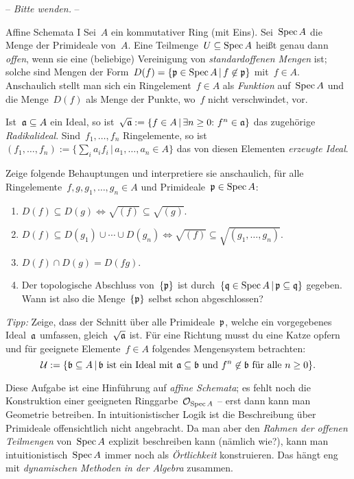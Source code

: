 \documentclass{uebblatt}
\begin{document}
\begin{center}-- \emph{Bitte wenden.} --\end{center}

\newpage

\begin{aufgabe}{Affine Schemata I}
Sei~$A$ ein kommutativer Ring (mit Eins). Sei~$\operatorname{Spec} A$ die Menge der Primideale
von~$A$. Eine Teilmenge~$U \subseteq \operatorname{Spec} A$ heißt genau dann \emph{offen},
wenn sie eine (beliebige) Vereinigung von \emph{standardoffenen Mengen}
ist; solche sind Mengen der Form~$D(f) = \{ \mathfrak{p} \in \operatorname{Spec} A \,|\, f \not\in
\mathfrak{p} \}$ mit~$f \in A$. Anschaulich stellt man sich ein Ringelement~$f \in A$
als \emph{Funktion} auf~$\operatorname{Spec} A$ und die Menge~$D(f)$ als Menge der Punkte,
wo~$f$ nicht verschwindet, vor.

Ist~$\mathfrak{a} \subseteq A$ ein Ideal, so ist~$\sqrt{\mathfrak{a}} := \{ f \in A \,|\,
\exists n \geq 0{:}\ f^n \in \mathfrak{a} \}$ das zugehörige \emph{Radikalideal}.
Sind~$f_1,\ldots,f_n$ Ringelemente, so ist~$(f_1,\ldots,f_n) := \{ \sum_i a_i
f_i \,|\, a_1,\ldots,a_n \in A \}$ das von diesen Elementen \emph{erzeugte
Ideal}.

Zeige folgende Behauptungen und interpretiere sie anschaulich, für alle
Ringelemente~$f,g,g_1,\ldots,g_n \in A$ und Primideale~$\mathfrak{p} \in \operatorname{Spec} A$:
\begin{enumerate}
\item $D(f) \subseteq D(g) \Longleftrightarrow \sqrt{(f)} \subseteq
\sqrt{(g)}$.
\item $D(f) \subseteq D(g_1) \cup \cdots \cup D(g_n) \Longleftrightarrow
\sqrt{(f)} \subseteq \sqrt{(g_1,\ldots,g_n)}$.
\item $D(f) \cap D(g) = D(fg)$.
\item Der topologische Abschluss von~$\{\mathfrak{p}\}$ ist
durch~$\{ \mathfrak{q} \in \operatorname{Spec} A \,|\, \mathfrak{p} \subseteq \mathfrak{q} \}$ gegeben.
Wann ist also die Menge~$\{\mathfrak{p}\}$ selbst schon abgeschlossen?
\end{enumerate}

\emph{Tipp:} Zeige, dass der Schnitt über alle Primideale~$\mathfrak{p}$, welche ein
vorgegebenes Ideal~$\mathfrak{a}$ umfassen, gleich~$\sqrt{\mathfrak{a}}$ ist. Für eine Richtung
musst du eine Katze opfern und für geeignete Elemente~$f \in A$
folgendes Mengensystem betrachten:
\[ \mathcal{U} := \{ \mathfrak{b} \subseteq A \,|\, \text{$\mathfrak{b}$ ist ein Ideal mit $\mathfrak{a}
\subseteq \mathfrak{b}$ und~$f^n \not\in \mathfrak{b}$ für alle~$n \geq 0$} \}. \]

Diese Aufgabe ist eine Hinführung auf \emph{affine Schemata}; es fehlt noch
die Konstruktion einer geeigneten Ringgarbe~$\mathcal{O}_{\operatorname{Spec} A}$ -- erst dann kann
man Geometrie betreiben.
In intuitionistischer Logik ist die Beschreibung über
Primideale offensichtlich nicht angebracht. Da man aber den \emph{Rahmen der
offenen Teilmengen} von~$\operatorname{Spec} A$ explizit beschreiben kann (nämlich wie?),
kann man intuitionistisch~$\operatorname{Spec} A$ immer noch als \emph{Örtlichkeit}
konstruieren. Das hängt eng mit \emph{dynamischen Methoden in der Algebra}
zusammen.
\end{aufgabe}
\enlargethispage{2em}
\end{document}
